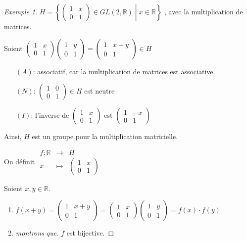\documentclass{report}
\newcommand*{\reels}{\mathbb{R}}
\theoremstyle{definition}
\theoremstyle{remark}
\newtheorem*{exem}{Exemple}
\begin{document}
	\begin{exem}
		\(
		H= \left\lbrace \begin{pmatrix}
			1&x\\0&1
		\end{pmatrix} \in GL(2, \reels) \middle| x \in \reels \right\rbrace
		\)
		, avec la multiplication de matrices.

		Soient $\begin{pmatrix}
			1&x\\0&1
		\end{pmatrix} \begin{pmatrix}
			1&y\\0&1
		\end{pmatrix} = \begin{pmatrix}
			1&x+y\\0&1
		\end{pmatrix} \in H$
		\begin{itemize}
			\item[$(A)$:] associatif, car la multiplication de matrices est associative.
			\item[$(N)$:] $\begin{pmatrix}
				1&0\\0&1
			\end{pmatrix} \in H$ est neutre
			\item[$(I)$:] l'inverse de $\begin{pmatrix}
				1&x\\0&1
			\end{pmatrix}$ est $\begin{pmatrix}
				1&-x\\0&1
			\end{pmatrix}$
		\end{itemize}
		Ainsi, $H$ est un groupe pour la multiplication matricielle.

		On d\'efinit
		$\begin{array}{rcl}
			f:\reels &\to& H\\
			x&\mapsto&\begin{pmatrix}
				1&x\\0&1
			\end{pmatrix}
		\end{array}$

		Soient $x,y \in \reels$.
		\begin{enumerate}[label=(\arabic*)]
			\item $f(x+y) = \begin{pmatrix}
				1&x+y\\0&1
			\end{pmatrix} = \begin{pmatrix}
			1&x\\0&1
			\end{pmatrix} \begin{pmatrix}
			1&y\\0&1
			\end{pmatrix} = f(x) \cdot f(y)$
			\item
			\begin{proof}[montrons que]
				$f$ est bijective.


\end{proof}
\end{enumerate}
\end{exem}
\end{document}

